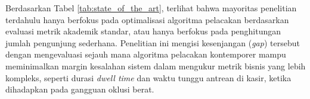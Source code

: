 Berdasarkan Tabel \ref{tab:state_of_the_art}, terlihat bahwa mayoritas penelitian terdahulu hanya berfokus pada optimalisasi algoritma pelacakan berdasarkan evaluasi metrik akademik standar, atau hanya berfokus pada penghitungan jumlah pengunjung sederhana. Penelitian ini mengisi kesenjangan (\textit{gap}) tersebut dengan mengevaluasi sejauh mana algoritma pelacakan kontemporer mampu meminimalkan margin kesalahan sistem dalam mengukur metrik bisnis yang lebih kompleks, seperti durasi \textit{dwell time} dan waktu tunggu antrean di kasir, ketika dihadapkan pada gangguan oklusi berat.